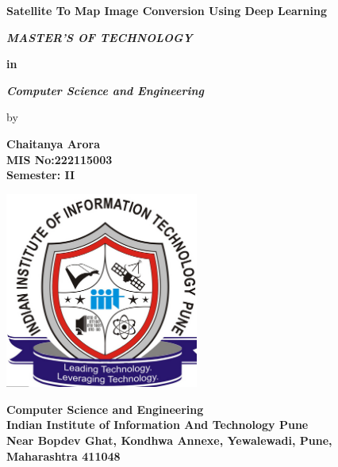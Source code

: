\begin{titlepage}
	\begin{center}
	\fontsize{18pt}{18pt} \selectfont \textbf{Satellite To Map Image Conversion Using Deep Learning}
	\vspace*{1.4cm}

	\fontsize{13pt}{13pt} \selectfont {A Project report submitted in partial fulfillment of the requirements for the award of the degree of}
	
	
	\vspace*{0.8cm}
	\fontsize{14pt}{1cm}\selectfont\textbf{\textit{MASTER'S OF TECHNOLOGY } }
	
	\textbf{in\\}
	
	\fontsize{14pt}{1cm}\selectfont\textbf{\textit{Computer Science and Engineering}}
	
	\vspace*{0.8cm}
	by
	
	\vspace*{0.8cm}
	\textbf{Chaitanya Arora}\\
	\textbf{MIS No:222115003}\\
	\textbf{ Semester: II}
	
	\vspace*{0.4cm}
	\begin{center}
	  \includegraphics[width=2.5in]{iiitp_logo.png}  
	\end{center}
		\vspace*{0.3cm}
	\fontsize{12pt}{0.5cm}\selectfont \textbf{Computer Science and Engineering}\\
	\vspace*{0.5cm}
	\fontsize{12pt}{12pt}\selectfont \textbf{Indian Institute of Information And Technology Pune}\\
	\vspace*{0.5cm}
	\fontsize{12pt}{12pt}\selectfont \textbf{Near Bopdev Ghat, Kondhwa Annexe, Yewalewadi, Pune, Maharashtra 411048}\\
	
	\vspace*{1.3cm}
		
\end{center}
\end{titlepage}
